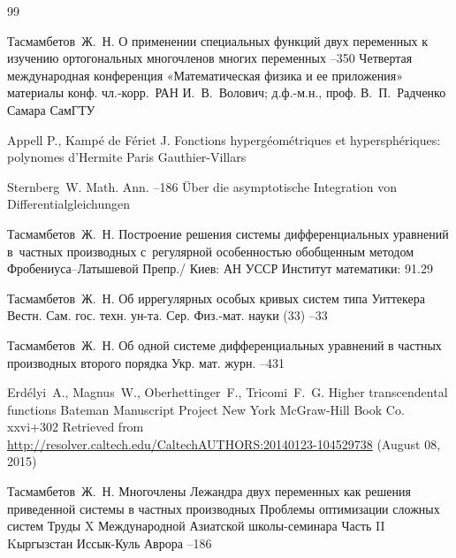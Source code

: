 \begin{thebibliography}{99}

\by  Тасмамбетов~Ж.~Н. 
\paper О применении специальных функций двух переменных к изучению ортогональных многочленов многих переменных 
--350
\inbook Четвертая международная конференция «Математическая физика и ее приложения»
\bookinfo материалы конф. 
\eds чл.-корр.~РАН И.~В.~Волович; д.ф.-м.н., проф. В.~П.~Радченко
\publaddr Самара
\publ СамГТУ



\by Appell P., Kamp\'e de F\'eriet J.
\book Fonctions hyperg\'eom\'etriques et hypersph\'eriques: polynomes d'Hermite
\publaddr Paris
\publ Gauthier-Villars

\by Sternberg~W. 
\jour Math. Ann.
--186
\paper \"Uber die asymptotische Integration von Differentialgleichungen


\by Тасмамбетов~Ж.~Н.
\preprint  Построение решения системы дифференциальных уравнений в~частных производных с~регулярной особенностью обобщенным методом Фробениуса--Латышевой
\preprintinfo Препр./ Киев: АН УССР Институт математики: 91.29


\by Тасмамбетов~Ж.~Н.
\paper Об иррегулярных особых кривых систем типа Уиттекера
\jour Вестн. Сам. гос. техн. ун-та. Сер. Физ.-мат. науки
(33)
--33

\by Тасмамбетов~Ж.~Н.
\paper Об одной системе дифференциальных уравнений в частных производных второго порядка 
\jour Укр. мат. журн. 
--431


\by Erd\'elyi~A., Magnus~W., Oberhettinger~F., Tricomi~F.~G.
\book Higher transcendental functions
\serial Bateman Manuscript Project
\publaddr New York
\publ McGraw-Hill Book Co. 
\totalpages xxvi+302 
\elink Retrieved from  \url{http://resolver.caltech.edu/CaltechAUTHORS:20140123-104529738} (August 08, 2015)

\by Тасмамбетов~Ж.~Н.
\paper Многочлены Лежандра двух переменных как решения приведенной системы в частных производных 
\inbook Проблемы оптимизации сложных систем
\bookinfo Труды X Международной Азиатской школы-семинара
\volinfo Часть II 
\publaddr Kыргызстан 
\publ Иссык-Куль Аврора 
--186


\end{thebibliography}

